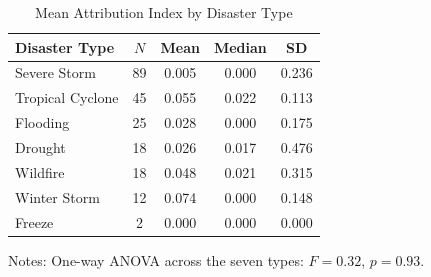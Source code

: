 \documentclass[12pt]{article}
\begin{document}
\begin{table}[ht]
\centering
\caption{Mean Attribution Index by Disaster Type}
\label{tab:type_means}
\begin{threeparttable}
\begin{tabular}{lcccc}
\toprule
Disaster Type & $N$ & Mean & Median & SD \\
\midrule
Severe Storm      & 89 & 0.005 & 0.000 & 0.236 \\
Tropical Cyclone  & 45 & 0.055 & 0.022 & 0.113 \\
Flooding          & 25 & 0.028 & 0.000 & 0.175 \\
Drought           & 18 & 0.026 & 0.017 & 0.476 \\
Wildfire          & 18 & 0.048 & 0.021 & 0.315 \\
Winter Storm      & 12 & 0.074 & 0.000 & 0.148 \\
Freeze            &  2 & 0.000 & 0.000 & 0.000 \\
\bottomrule
\end{tabular}
\begin{tablenotes}
\small
\item Notes: One-way ANOVA across the seven types: $F=0.32$, $p=0.93$.
\end{tablenotes}
\end{threeparttable}
\end{table}
\end{document}
